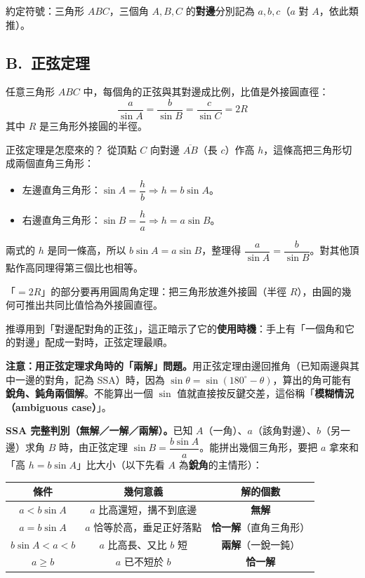 \documentclass[11pt]{article}
\begin{document}
約定符號：三角形 $ABC$，三個角 $A,B,C$ 的\textbf{對邊}分別記為 $a,b,c$（$a$ 對 $A$，依此類推）。


\subsection*{\sffamily B.\ 正弦定理}

任意三角形 $ABC$ 中，每個角的正弦與其對邊成比例，比值是外接圓直徑：
$$\boxed{\;\frac{a}{\sin A}=\frac{b}{\sin B}=\frac{c}{\sin C}=2R\;}$$
其中 $R$ 是三角形外接圓的半徑。

\begin{補充框}{正弦定理是怎麼來的？}
從頂點 $C$ 向對邊 $\overline{AB}$（長 $c$）作高 $h$，這條高把三角形切成兩個直角三角形：
\begin{itemize}\setlength{\itemsep}{1pt}
\item 左邊直角三角形：$\sin A=\dfrac{h}{b}\Rightarrow h=b\sin A$。
\item 右邊直角三角形：$\sin B=\dfrac{h}{a}\Rightarrow h=a\sin B$。
\end{itemize}
兩式的 $h$ 是同一條高，所以 $b\sin A=a\sin B$，整理得 $\dfrac{a}{\sin A}=\dfrac{b}{\sin B}$。對其他頂點作高同理得第三個比也相等。

「$=2R$」的部分要再用圓周角定理：把三角形放進外接圓（半徑 $R$），由圓的幾何可推出共同比值恰為外接圓直徑。

推導用到「對邊配對角的正弦」，這正暗示了它的\textbf{使用時機}：手上有「一個角和它的對邊」配成一對時，正弦定理最順。
\end{補充框}

\textbf{注意：用正弦定理求角時的「兩解」問題。}用正弦定理由邊回推角（已知兩邊與其中一邊的對角，記為 SSA）時，因為 $\sin\theta=\sin(180^\circ-\theta)$，算出的角可能有\textbf{銳角、鈍角兩個解}。不能算出一個 $\sin$ 值就直接按反鍵交差，這俗稱「\textbf{模糊情況（ambiguous case）}」。

\textbf{SSA 完整判別（無解／一解／兩解）。}已知 $A$（一角）、$a$（該角對邊）、$b$（另一邊）求角 $B$ 時，由正弦定理 $\sin B=\dfrac{b\sin A}{a}$。能拼出幾個三角形，要把 $a$ 拿來和「高 $h=b\sin A$」比大小（以下先看 $A$ 為\textbf{銳角}的主情形）：

\begin{center}
\renewcommand{\arraystretch}{1.4}
\begin{tabular}{c|c|c}
\hline
條件 & 幾何意義 & 解的個數 \\
\hline
$a<b\sin A$ & $a$ 比高還短，搆不到底邊 & \textbf{無解} \\
$a=b\sin A$ & $a$ 恰等於高，垂足正好落點 & \textbf{恰一解}（直角三角形） \\
$b\sin A<a<b$ & $a$ 比高長、又比 $b$ 短 & \textbf{兩解}（一銳一鈍） \\
$a\ge b$ & $a$ 已不短於 $b$ & \textbf{恰一解} \\
\hline
\end{tabular}
\end{center}
\end{document}
